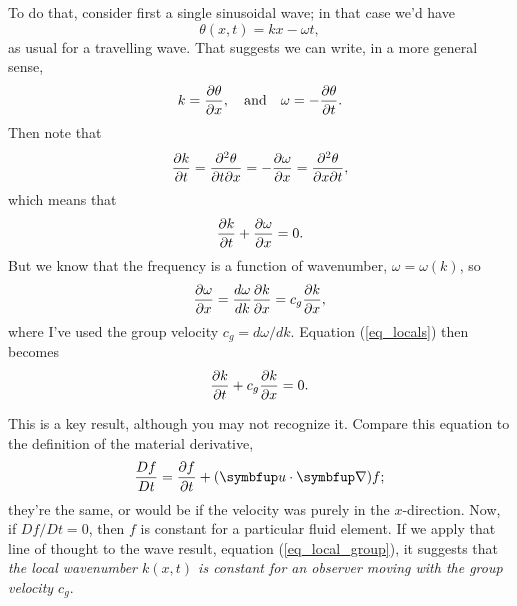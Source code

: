 To do that, consider first a single sinusoidal wave; in that case we'd have
\[
\theta(x, t) = kx - \omega t,
\]
as usual for a travelling wave.  That suggests we can write, in a more general sense,
\begin{equation}
k = \frac{\partial {\theta}}{\partial {x}}, \quad \text{and} \quad \omega = -\frac{\partial {\theta}}{\partial {t}}.
\end{equation}
Then note that 
\[
\frac{\partial {k}}{\partial {t}} = \frac{\partial^2 \theta}{\partial t \partial x} = -\frac{\partial {\omega}}{\partial {x}} = \frac{\partial^2 \theta}{\partial x \partial t},
\]
which means that
\begin{equation}
\label{eq_locals}
\frac{\partial {k}}{\partial {t}} + \frac{\partial {\omega}}{\partial {x}} = 0.
\end{equation}
But we know that the frequency is a function of wavenumber, $\omega = \omega(k)$, so
\[
\frac{\partial {\omega}}{\partial {x}} = \frac{d\omega}{dk}\frac{\partial {k}}{\partial {x}} = c_g \frac{\partial {k}}{\partial {x}},
\]
where I've used the group velocity $c_g = d\omega/dk$.  Equation (\ref{eq_locals}) then becomes
\begin{equation}
\label{eq_local_group}
\frac{\partial {k}}{\partial {t}} + c_g \frac{\partial {k}}{\partial {x}} = 0.
\end{equation}

This is a key result, although you may not recognize it.  Compare this equation to the definition of the material derivative,
\[
\frac{Df}{Dt} = \dfdx{f}{t} + (\vec{u} \cdot \grad ) f;
\]
they're the same, or would be if the velocity was purely in the $x$-direction.  Now, if $Df/Dt = 0$, then $f$ is constant for a particular fluid element.  If we apply that line of thought to the wave result, equation (\ref{eq_local_group}), it suggests that \emph{the local wavenumber $k(x, t)$ is constant for an observer moving with the group velocity $c_g$}.

